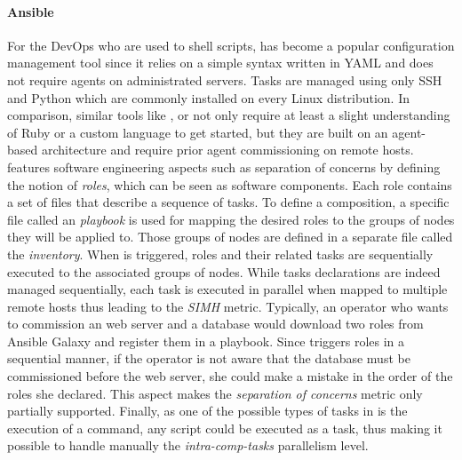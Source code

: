 \paragraph{Ansible}
For the DevOps who are used to shell scripts, \ansible has become a popular configuration management tool since it relies on a simple syntax written in YAML and does not require agents on administrated servers. Tasks are managed using only SSH and Python which are commonly installed on every Linux distribution. In comparison, similar tools like \chef, \puppet or \cfengine not only require at least a slight understanding of Ruby or a custom language to get started, but they are built on an agent-based architecture and require prior agent commissioning on remote hosts. \ansible features software engineering aspects such as separation of concerns by defining the notion of \emph{roles}, which can be seen as software components. Each role contains a set of files that describe a sequence of tasks. To define a composition, a specific file called an \ansible \emph{playbook} is used for mapping the desired roles to the groups of nodes they will be applied to. Those groups of nodes are defined in a separate file called the \emph{inventory}. When \ansible is triggered, roles and their related tasks are sequentially executed to the associated groups of nodes. While tasks declarations are indeed managed sequentially, each task is executed in parallel when mapped to multiple remote hosts thus leading to the \emph{SIMH} metric. Typically, an operator who wants to commission an \apache web server and a \mysql database would download two roles from Ansible Galaxy and register them in a playbook. Since \ansible triggers roles in a sequential manner, if the operator is not aware that the database must be commissioned before the web server, she could make a mistake in the order of the roles she declared. This aspect makes the \emph{separation of concerns} metric only partially supported. Finally, as one of the possible types of tasks in \ansible is the execution of a \shell command, any script could be executed as a task, thus making it possible to handle manually the \emph{intra-comp-tasks} parallelism level.


